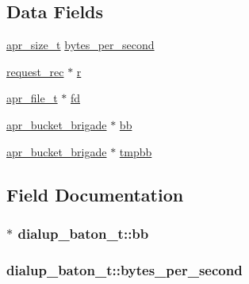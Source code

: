 \subsection*{Data Fields}
\begin{DoxyCompactItemize}
\item 
\hyperlink{group__apr__platform_gaaa72b2253f6f3032cefea5712a27540e}{apr\+\_\+size\+\_\+t} \hyperlink{structdialup__baton__t_a5ed1144b66d9e4c8bfb8d0dd9ed4e013}{bytes\+\_\+per\+\_\+second}
\item 
\hyperlink{structrequest__rec}{request\+\_\+rec} $\ast$ \hyperlink{structdialup__baton__t_a63966e215229e8b9b825b45be0646a75}{r}
\item 
\hyperlink{structapr__file__t}{apr\+\_\+file\+\_\+t} $\ast$ \hyperlink{structdialup__baton__t_a3071ed66c795266e02c550ddf7131ce2}{fd}
\item 
\hyperlink{structapr__bucket__brigade}{apr\+\_\+bucket\+\_\+brigade} $\ast$ \hyperlink{structdialup__baton__t_aad9c9ff6f4b61d585fa3c24cb8f560c5}{bb}
\item 
\hyperlink{structapr__bucket__brigade}{apr\+\_\+bucket\+\_\+brigade} $\ast$ \hyperlink{structdialup__baton__t_af80379b2b8174ab9c59fe53783d21883}{tmpbb}
\end{DoxyCompactItemize}


\subsection{Field Documentation}
\subsubsection[{\texorpdfstring{bb}{bb}}]{$\ast$ dialup\+\_\+baton\+\_\+t\+::bb}\hypertarget{structdialup__baton__t_aad9c9ff6f4b61d585fa3c24cb8f560c5}{}\label{structdialup__baton__t_aad9c9ff6f4b61d585fa3c24cb8f560c5}
\subsubsection[{\texorpdfstring{bytes\+\_\+per\+\_\+second}{bytes_per_second}}]{ dialup\+\_\+baton\+\_\+t\+::bytes\+\_\+per\+\_\+second}\hypertarget{structdialup__baton__t_a5ed1144b66d9e4c8bfb8d0dd9ed4e013}{}\label{structdialup__baton__t_a5ed1144b66d9e4c8bfb8d0dd9ed4e013}
